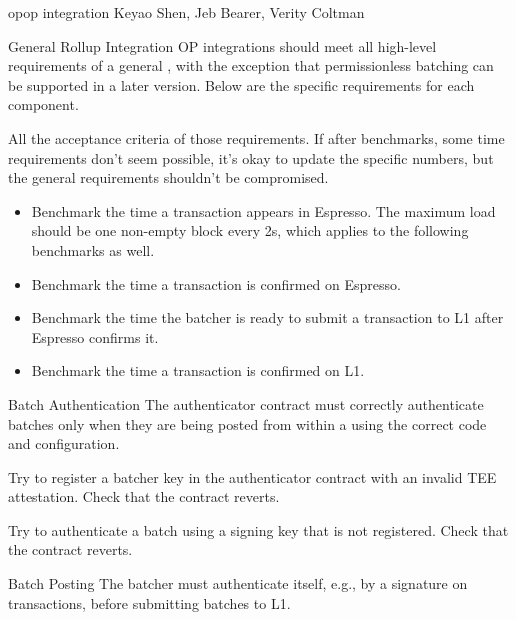 \begin{requirementspage}{op}{op integration}{
    Keyao Shen, Jeb Bearer, Verity Coltman
}
    \begin{requirement}{General Rollup Integration}
        OP integrations should meet all high-level requirements of a general
        , with the exception that permissionless batching can be supported
        in a later version. Below are the specific requirements for each component.

        \acceptance All the acceptance criteria of those requirements. If after benchmarks, some
        time requirements don't seem possible, it's okay to update the specific numbers, but the
        general requirements shouldn't be compromised.

        \acceptance
            \begin{itemize}
                \item Benchmark the time a transaction appears in Espresso. The maximum load should
                be one non-empty block every 2s, which applies to the following benchmarks as well.
                \item Benchmark the time a transaction is confirmed on Espresso.
                \item Benchmark the time the batcher is ready to submit a transaction to L1 after
                Espresso confirms it.
                \item Benchmark the time a transaction is confirmed on L1.
            \end{itemize}
    \end{requirement}

    \begin{requirement}{Batch Authentication}
        The authenticator contract must correctly authenticate batches only when they are being
        posted from within a \tee using the correct code and configuration.

        \acceptance Try to register a batcher key in the authenticator contract with an invalid TEE
        attestation. Check that the contract reverts.

        \acceptance Try to authenticate a batch using a signing key that is not registered.
        Check that the contract reverts.
    \end{requirement}

    \begin{requirement}{Batch Posting}
        The batcher must authenticate itself, e.g., by a signature on transactions, before
        submitting batches to L1.


\end{requirement}
\end{requirementspage}

